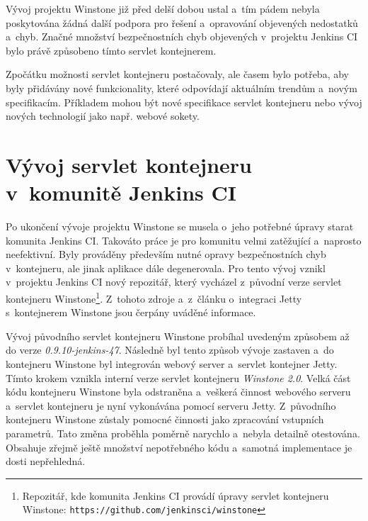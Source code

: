             Vývoj projektu Winstone již před delší dobou ustal a~tím pádem nebyla poskytována 
            žádná další podpora pro řešení a~opravování objevených nedostatků a~chyb. 
            Značné množství bezpečnostních chyb objevených v~projektu Jenkins CI bylo právě
            způsobeno tímto servlet kontejnerem.

            Zpočátku možnosti servlet kontejneru postačovaly, ale časem bylo potřeba, aby 
            byly přidávány nové funkcionality, které odpovídají aktuálním trendům
            a~novým specifikacím. Příkladem mohou být nové specifikace servlet kontejneru nebo
            vývoj nových technologií jako např. webové sokety.


    \section{Vývoj servlet kontejneru v~komunitě Jenkins CI} \label{vyvojWinstone}
        Po ukončení vývoje projektu Winstone se musela o~jeho potřebné úpravy starat komunita
        Jenkins CI. Takováto práce je pro komunitu velmi zatěžující
        a~naprosto neefektivní. Byly prováděny především nutné opravy bezpečnostních chyb v~kontejneru,
        ale jinak aplikace dále degenerovala. Pro tento vývoj vznikl v~projektu Jenkins CI nový 
        repozitář, který vycházel z~původní verze servlet kontejneru 
        Winstone\footnote{Repozitář, kde komunita Jenkins CI provádí úpravy servlet kontejneru Winstone:
        \texttt{https://github.com/jenkinsci/winstone}}. Z~tohoto zdroje
        a~z~článku o~integraci Jetty s~kontejnerem Winstone \cite{kohsukeTopic} jsou čerpány uváděné informace. 
        
        \medskip
        Vývoj původního servlet kontejneru Winstone probíhal uvedeným způsobem 
        až do verze \emph{0.9.10-jenkins-47}. Následně byl tento způsob vývoje zastaven
        a~do kontejneru Winstone byl integrován webový server a~servlet kontejner
        Jetty. Tímto krokem vznikla 
        interní verze servlet kontejneru \emph{Winstone 2.0}. Velká část kódu 
        kontejneru Winstone byla odstraněna a~veškerá činnost webového serveru a~servlet 
        kontejneru je nyní vykonávána pomocí serveru Jetty. Z~původního kontejneru Winstone
        zůstaly pomocné činnosti jako zpracování vstupních parametrů.
        Tato změna proběhla poměrně narychlo
        a~nebyla detailně otestována. Obsahuje zřejmě ještě množství nepotřebného kódu
        a~samotná implementace je dosti nepřehledná.

